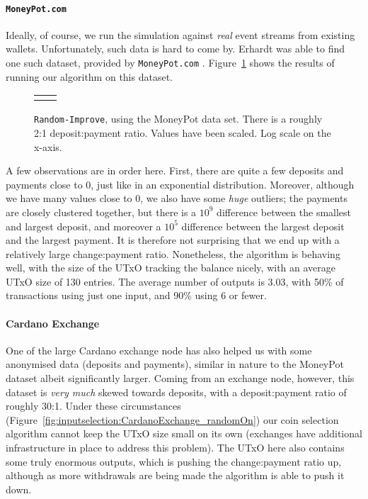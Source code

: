 \documentclass{article}
\theoremstyle{definition}{
  \newtheorem{lemma}{Lemma}[section] %
  \newtheorem{definition}[lemma]{Definition}
}
\theoremstyle{theorem}{
  \newtheorem{invariant}[lemma]{Invariant}
  \newtheorem{proofobligation}[lemma]{Proof Obligation}
}
\numberwithin{equation}{lemma}
\begin{document}
\paragraph{\texttt{MoneyPot.com}}

Ideally, of course, we run the simulation against \emph{real} event streams from
existing wallets. Unfortunately, such data is hard to come by. Erhardt was able
to find one such dataset, provided by \texttt{MoneyPot.com}
\citep{MoneyPotdataset}. Figure~\ref{fig:inputselection:MoneyPot_randomOn} shows
the results of running our algorithm on this dataset.

\begin{figure}[p]
\begin{center}
\scriptsize
\begin{tabular}{ll}
 &

\end{tabular}
\end{center}
\caption{\label{fig:inputselection:MoneyPot_randomOn}
  \texttt{Random-Improve}, using the MoneyPot data set. There is a roughly 2:1
  deposit:payment ratio. Values have been scaled. Log scale on the x-axis.
}
\end{figure}

A few observations are in order here. First, there are quite a few deposits and
payments close to 0, just like in an exponential distribution. Moreover,
although we have many values close to 0, we also have some \emph{huge} outliers; the
payments are closely clustered together, but there is a $10^9$ difference between
the smallest and largest deposit, and moreover a $10^5$ difference between the
largest deposit and the largest payment. It is therefore not surprising that we
end up with a relatively large change:payment ratio. Nonetheless, the algorithm
is behaving well, with the size of the UTxO tracking the balance nicely, with an
average UTxO size of 130 entries. The average number of outputs is 3.03, with
50\% of transactions using just one input, and 90\% using 6 or fewer.

\paragraph{Cardano Exchange}

One of the large Cardano exchange node has also helped us with
some anonymised data (deposits and payments), similar in nature to the
MoneyPot dataset albeit significantly larger. Coming from an exchange node,
however, this dataset is \emph{very much} skewed towards deposits, with a
deposit:payment ratio of roughly 30:1. Under these circumstances
(Figure~\ref{fig:inputselection:CardanoExchange_randomOn}) our coin selection
algorithm cannot keep the UTxO size small on its own (exchanges have additional
infrastructure in place to address this problem). The UTxO here also contains
some truly enormous outputs, which is pushing the change:payment ratio up,
although as more withdrawals are being made the algorithm is able to push it
down.
\end{document}
